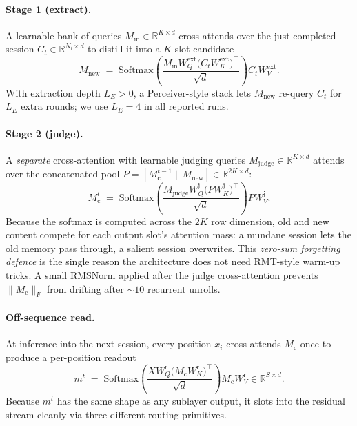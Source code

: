\documentclass{article}
\newcommand{\Mc}{M_{\text{c}}}
\newcommand{\Min}{M_{\text{in}}}
\newcommand{\Mj}{M_{\text{judge}}}
\newcommand{\Mnew}{M_{\text{new}}}
\begin{document}
\paragraph{Stage 1 (extract).} A learnable bank of queries
$\Min \in \mathbb{R}^{K \times d}$ cross-attends over the just-completed
session $C_t \in \mathbb{R}^{N_t \times d}$ to distill it into a
$K$-slot candidate
\begin{equation}
\Mnew \;=\; \mathrm{Softmax}\!\left(\frac{\Min W_Q^{\text{ext}}\bigl(C_t W_K^{\text{ext}}\bigr)^\top}{\sqrt{d}}\right) C_t W_V^{\text{ext}}.
\label{eq:extract}
\end{equation}
With extraction depth $L_E > 0$, a Perceiver-style stack lets
$\Mnew$ re-query $C_t$ for $L_E$ extra rounds; we use $L_E = 4$ in
all reported runs.

\paragraph{Stage 2 (judge).} A \emph{separate} cross-attention with
learnable judging queries $\Mj \in \mathbb{R}^{K \times d}$ attends
over the concatenated pool
$P = [\Mc^{t-1} \parallel \Mnew] \in \mathbb{R}^{2K \times d}$:
\begin{equation}
\Mc^t \;=\; \mathrm{Softmax}\!\left(\frac{\Mj W_Q^{\text{j}}\bigl(P W_K^{\text{j}}\bigr)^\top}{\sqrt{d}}\right) P W_V^{\text{j}}.
\label{eq:judge}
\end{equation}
Because the softmax is computed across the $2K$ row dimension, old
and new content compete for each output slot's attention mass: a
mundane session lets the old memory pass through, a salient session
overwrites. This \emph{zero-sum forgetting defence} is the single
reason the architecture does not need RMT-style warm-up tricks.
A small RMSNorm applied after the judge cross-attention prevents
$\|\Mc\|_F$ from drifting after $\sim 10$ recurrent unrolls.

\paragraph{Off-sequence read.} At inference into the next session,
every position $x_i$ cross-attends $\Mc$ once to produce a
per-position readout
\begin{equation}
m^t \;=\; \mathrm{Softmax}\!\left(\frac{X W_Q^{\text{r}}\bigl(\Mc W_K^{\text{r}}\bigr)^\top}{\sqrt{d}}\right) \Mc W_V^{\text{r}} \in \mathbb{R}^{S \times d}.
\label{eq:read}
\end{equation}
Because $m^t$ has the same shape as any sublayer output, it slots
into the residual stream cleanly via three different routing primitives.
\end{document}
